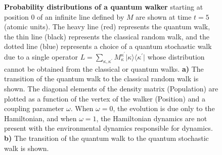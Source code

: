 \documentclass[11pt,oneside,final]{huthesis}%
\begin{document}
\begin{figure}[htb]
\begin{center}
\end{center}  
\caption{\textbf{Probability distributions of a quantum walker} starting at position $0$ of an infinite line defined by $M$ are shown at time $t=5$ (atomic units).  The heavy line (red) represents the quantum walk, the thin line (black) represents the classical random walk, and the dotted line (blue) represents a choice of a quantum stochastic walk  due to a single operator $L=\sum_{\kappa,\kappa^\prime}M_\kappa^{\kappa^\prime}\vert  \kappa \rangle\langle \kappa^\prime\vert$ whose distribution cannot be obtained from the classical or quantum walks. \textbf{a)} The transition of the quantum walk to the classical random walk is shown.  The diagonal elements of the density matrix (Population) are plotted as a function of the vertex of the walker (Position) and a coupling parameter $\omega$.  When $\omega=0$, the evolution is due only to the Hamiltonian, and when $\omega=1$, the Hamiltonian dynamics are not present with the environmental dynamics responsible for dynamics.  \textbf{b)} The transition of the quantum walk to the quantum stochastic walk is shown.}
\label{fig1}
\end{figure}
\end{document}
